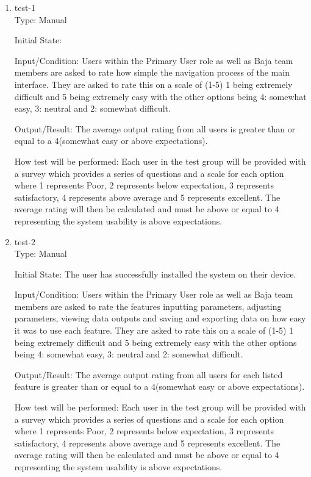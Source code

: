 \documentclass[12pt, titlepage]{article}
\begin{document}
\begin{enumerate}

  \item \label{usetest-1}test-1\\

Type: Manual
					
Initial State: 
					
Input/Condition: Users within the Primary User role as well as Baja team members are asked to rate how simple the navigation process of the main interface. 
They are asked to rate this on a scale of (1-5) 1 being extremely difficult and 5 being extremely easy with the other options being 4: somewhat easy, 3: neutral and 2: somewhat difficult. 
					
Output/Result: The average output rating from all users is greater than or equal to a 4(somewhat easy or above expectations).
					
How test will be performed: Each user in the test group will be provided with a survey which provides a series of questions and a scale for each option where 1 represents Poor, 2 represents below expectation, 3 represents satisfactory, 4 represents above average and 5 represents excellent.
The average rating will then be calculated and must be above or equal to 4 representing the system usability is above expectations.  

\item \label{usetest-2}test-2\\

  
Type: Manual
            
Initial State: The user has successfully installed the system on their device.
            
Input/Condition: Users within the Primary User role as well as Baja team members are asked to rate the features inputting parameters, adjusting parameters, viewing data outputs and saving and exporting data on how easy it was to use each feature.
They are asked to rate this on a scale of (1-5) 1 being extremely difficult and 5 being extremely easy with the other options being 4: somewhat easy, 3: neutral and 2: somewhat difficult. 
            
Output/Result: The average output rating from all users for each listed feature is greater than or equal to a 4(somewhat easy or above expectations).
            
How test will be performed: Each user in the test group will be provided with a survey which provides a series of questions and a scale for each option where 1 represents Poor, 2 represents below expectation, 3 represents satisfactory, 4 represents above average and 5 represents excellent.
The average rating will then be calculated and must be above or equal to 4 representing the system usability is above expectations. 
  
\end{enumerate}
\end{document}
